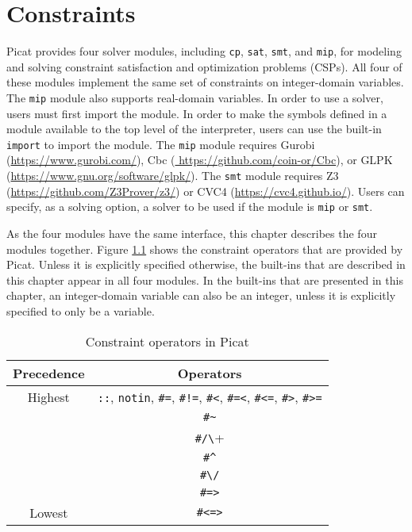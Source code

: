 \chapter{\label{ch:constraints}Constraints}
Picat provides four solver modules, including \texttt{cp}, \texttt{sat}, \texttt{smt}, and \texttt{mip}, for modeling and solving constraint satisfaction and optimization problems (CSPs).  All four of these modules implement the same set of constraints on integer-domain variables. The \texttt{mip} module also supports real-domain variables. In order to use a solver, users must first import the module. In order to make the symbols defined in a module available to the top level of the interpreter, users can use the built-in {\tt import} to import the module. The \texttt{mip} module requires Gurobi (\url{https://www.gurobi.com/}), Cbc (\url{ https://github.com/coin-or/Cbc}), or GLPK (\url{https://www.gnu.org/software/glpk/}). The \texttt{smt} module requires Z3 (\url{https://github.com/Z3Prover/z3/}) or CVC4 (\url{https://cvc4.github.io/}). Users can specify, as a solving option, a solver to be used if the module is \texttt{mip} or \texttt{smt}.

As the four modules have the same interface, this chapter describes the four modules together. Figure \ref{tab:cons_ops} shows the constraint operators that are provided by Picat. Unless it is explicitly specified otherwise, the built-ins that are described in this chapter appear in all four modules. In the built-ins that are presented in this chapter, an integer-domain variable can also be an integer, unless it is explicitly specified to only be a variable.

\begin{table}[ht]
\caption{\label{tab:cons_ops}Constraint operators in Picat}
\begin{center}
\begin{tabular}{ |c|c| } \hline
Precedence & Operators  \\ \hline \hline
Highest    & \verb+::+, \verb+notin+,  \verb+#=+,  \verb+#!=+, \verb+#<+,  \verb+#=<+, \verb+#<=+, \verb+#>+, \verb+#>=+ \\ \hline 
           & \verb+#~+ \\ \hline 
           & \verb+#/\+ \\ \hline 
           & \verb+#^+ \\ \hline 
           & \verb+#\/+ \\ \hline 
           & \verb+#=>+ \\ \hline 
Lowest     & \verb+#<=>+ \\ \hline 
\end{tabular}
\end{center}
\end{table}


